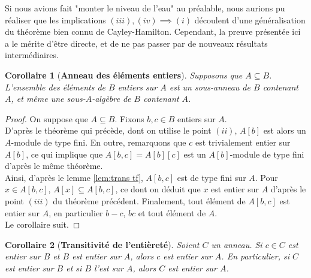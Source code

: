 \documentclass[10pt, twoside]{article}
\theoremstyle{plain}
\theoremstyle{definition}
\theoremstyle{plain}
\newtheorem{corollary}{Corollaire}[theorem]
\theoremstyle{plain}
\theoremstyle{definition}
\theoremstyle{remark}
\begin{document}
Si nous avions fait "monter le niveau de l'eau" au préalable, nous aurions pu réaliser que les implications $(iii),(iv) \implies (i)$ découlent d'une généralisation du théorème bien connu de Cayley-Hamilton. Cependant, la preuve présentée ici a le mérite d'être directe, et de ne pas passer par de nouveaux résultats intermédiaires.

\begin{corollary}[\textbf{Anneau des éléments entiers}]\label{thm:entier forme alg}
    Supposons que $A \subseteq B$. L'ensemble des éléments de $B$ entiers sur $A$ est un sous-anneau de $B$ contenant $A$, et même une sous-$A$-algèbre de $B$ contenant $A$. 
\end{corollary}

\begin{proof}
    On suppose que $A \subseteq B$. Fixons $b, c \in B$ entiers sur $A$.\\
    D'après le théorème qui précède, dont on utilise le point $(ii)$, $A[b]$ est alors un $A$-module de type fini. En outre, remarquons que $c$ est trivialement entier sur $A[b]$, ce qui implique que $A[b, c] = A[b][c]$ est un $A[b]$-module de type fini d'après le même théorème.\\
    Ainsi, d'après le lemme \ref{lem:trans tf}, $A[b, c]$ est de type fini sur $A$. Pour $x \in A[b, c]$, $A[x] \subseteq A[b, c]$, ce dont on déduit que $x$ est entier sur $A$ d'après le point $(iii)$ du théorème précédent. Finalement, tout élément de $A[b, c]$ est entier sur $A$, en particulier $b-c$, $bc$ et tout élément de $A$.\\
    Le corollaire suit.
\end{proof}

\begin{corollary}[\textbf{Transitivité de l'entièreté}]\label{thm:trans intégralité}
    Soient $C$ un anneau. Si $c \in C$ est entier sur $B$ et $B$ est entier sur $A$, alors $c$ est entier sur $A$. En particulier, si $C$ est entier sur $B$ et si $B$ l'est sur $A$, alors $C$ est entier sur $A$.
\end{corollary}
\end{document}
